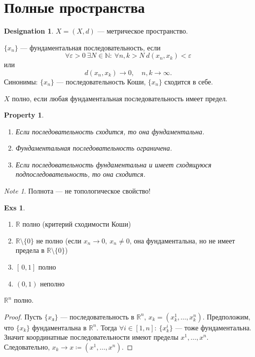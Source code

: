 \documentclass[11pt]{book}
\newcommand{\N}{\mathbb{N}}
\newcommand{\R}{\mathbb{R}}
\theoremstyle{definition}
\theoremstyle{plain}
\theoremstyle{plain}
\newtheorem*{prop}{Property}
\theoremstyle{definition}
\newtheorem*{exs}{Exs}
\newtheorem*{name}{Designation}
\theoremstyle{remark}
\newtheorem*{note}{Note}
\begin{document}
\section{Полные пространства}
\begin{name}
    $ X = (X, d)$ --- метрическое пространство.
\end{name}
\begin{defn}
    $ \{x_n\}$ --- фундаментальная последовательность, если \[
	\forall \varepsilon >0 ~ \exists N \in  \N: ~ \forall n, k > N ~ d(x_{n}, x_k) < \varepsilon 
    \] 
    или 
    \[
	d(x_{n}, x_k ) \to  0, \quad n, k \to  \infty
    .\] 
    Синонимы: $ \{x_{n}\}$ --- последовательность Коши, $ \{x_{n}\}$ сходится в себе.
\end{defn}
\begin{defn}
    $ X$ полно, если любая фундаментальная последовательность имеет предел.
\end{defn}
\begin{prop}
    $ $
    \begin{enumerate}
        \item Если последовательность сходится, то она фундаментальна.
	\item Фундаментальная последовательность ограничена.
	\item Если последовательность фундаментальна и имеет сходящуюся подпоследовательность, то она сходится.
    \end{enumerate}
\end{prop}
\begin{note}
    Полнота --- не топологическое свойство!
\end{note}
\begin{exs}
    $ $
    \begin{enumerate}
	\item $ \R $ полно (критерий сходимости Коши)
	\item $ \R \setminus \{0\}$ не полно (если $ x_{n} \to  0, ~ x_{n}\ne 0$, она фундаментальна, но не имеет предела в $ \R \setminus \{0\}$)
	\item $ [\,0, 1]$ полно
	\item $ (0, 1)$  неполно
    \end{enumerate}
\end{exs}
\begin{thm}
    $ \R^{n} $ полно.
\end{thm}
\begin{proof}
    Пусть $ \{x_{л}\}$ --- последовательность в $ \R^{n} $, $ x_k = (x_k^{1}, \ldots , x_k^{n})$.
    Предположим, что $ \{x_{k}\}$  фундаментальна в $ \R^{n} $. Тогда $ \forall  i \in [1, n]: ~ \{x_k^{i}\}$ --- тоже фундаментальна. Значит координатные последовательности имеют пределы $ x^{1}, \ldots , x^{n}$. Следовательно, $ x_k \to x \coloneqq (x^{1}, \ldots , x^{n})$.
\end{proof}
\end{document}
